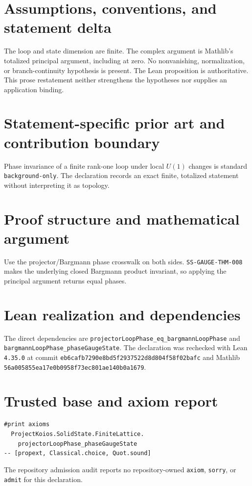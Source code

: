 \documentclass[11pt]{article}
\begin{document}
\section{Assumptions, conventions, and statement delta}
The loop and state dimension are finite.  The complex argument is Mathlib's totalized principal argument, including at zero.  No nonvanishing, normalization, or branch-continuity hypothesis is present.
The Lean proposition is authoritative.  This prose restatement neither strengthens the hypotheses
nor supplies an application binding.

\section{Statement-specific prior art and contribution boundary}
Phase invariance of a finite rank-one loop under local $U(1)$ changes is standard \texttt{background-only}.  The declaration records an exact finite, totalized statement without interpreting it as topology.

\section{Proof structure and mathematical argument}
Use the projector/Bargmann phase crosswalk on both sides.  \texttt{SS-GAUGE-THM-008} makes the underlying closed Bargmann product invariant, so applying the principal argument returns equal phases.

\section{Lean realization and dependencies}
The direct dependencies are \texttt{projectorLoopPhase\_eq\_bargmannLoopPhase} and \texttt{bargmannLoopPhase\_phaseGaugeState}.  The declaration was rechecked with Lean \texttt{4.35.0} at commit \texttt{eb6cafb7290e8bd5f2937522d8d804f58f02bafc} and Mathlib \texttt{56a005855ea17e0b0958f73ec801ae140b0a1679}.

\section{Trusted base and axiom report}
\begin{verbatim}
#print axioms
  ProjectKoios.SolidState.FiniteLattice.
    projectorLoopPhase_phaseGaugeState
-- [propext, Classical.choice, Quot.sound]
\end{verbatim}
The repository admission audit reports no repository-owned \texttt{axiom}, \texttt{sorry}, or
\texttt{admit} for this declaration.
\end{document}
